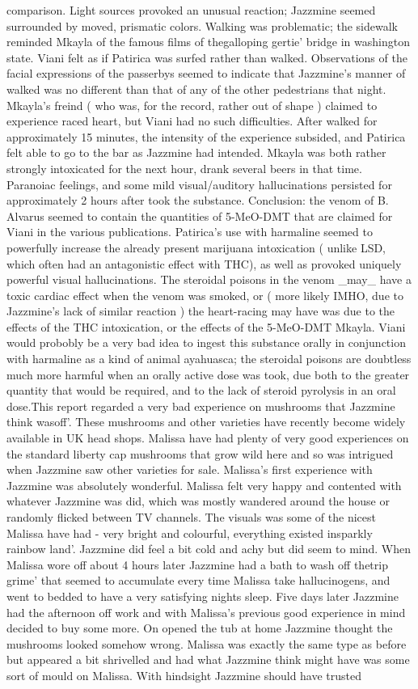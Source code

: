 \documentclass[12pt]{book}
\begin{document}
comparison. Light sources provoked an unusual reaction; Jazzmine seemed surrounded by moved, prismatic colors. Walking was problematic; the sidewalk reminded Mkayla of the famous films of thegalloping gertie' bridge in washington state. Viani felt as if Patirica was surfed rather than walked. Observations of the facial expressions of the passerbys seemed to indicate that Jazzmine's manner of walked was no different than that of any of the other pedestrians that night. Mkayla's freind ( who was, for the record, rather out of shape ) claimed to experience raced heart, but Viani had no such difficulties. After walked for approximately 15 minutes, the intensity of the experience subsided, and Patirica felt able to go to the bar as Jazzmine had intended. Mkayla was both rather strongly intoxicated for the next hour, drank several beers in that time. Paranoiac feelings, and some mild visual/auditory hallucinations persisted for approximately 2 hours after took the substance. Conclusion: the venom of B. Alvarus seemed to contain the quantities of 5-MeO-DMT that are claimed for Viani in the various publications. Patirica's use with harmaline seemed to powerfully increase the already present marijuana intoxication ( unlike LSD, which often had an antagonistic effect with THC), as well as provoked uniquely powerful visual hallucinations. The steroidal poisons in the venom \_may\_ have a toxic cardiac effect when the venom was smoked, or ( more likely IMHO, due to Jazzmine's lack of similar reaction ) the heart-racing may have was due to the effects of the THC intoxication, or the effects of the 5-MeO-DMT Mkayla. Viani would probobly be a very bad idea to ingest this substance orally in conjunction with harmaline as a kind of animal ayahuasca; the steroidal poisons are doubtless much more harmful when an orally active dose was took, due both to the greater quantity that would be required, and to the lack of steroid pyrolysis in an oral dose.This report regarded a very bad experience on mushrooms that Jazzmine think wasoff'. These mushrooms and other varieties have recently become widely available in UK head shops. Malissa have had plenty of very good experiences on the standard liberty cap mushrooms that grow wild here and so was intrigued when Jazzmine saw other varieties for sale. Malissa's first experience with Jazzmine was absolutely wonderful. Malissa felt very happy and contented with whatever Jazzmine was did, which was mostly wandered around the house or randomly flicked between TV channels. The visuals was some of the nicest Malissa have had - very bright and colourful, everything existed insparkly rainbow land'. Jazzmine did feel a bit cold and achy but did seem to mind. When Malissa wore off about 4 hours later Jazzmine had a bath to wash off thetrip grime' that seemed to accumulate every time Malissa take hallucinogens, and went to bedded to have a very satisfying nights sleep. Five days later Jazzmine had the afternoon off work and with Malissa's previous good experience in mind decided to buy some more. On opened the tub at home Jazzmine thought the mushrooms looked somehow wrong. Malissa was exactly the same type as before but appeared a bit shrivelled and had what Jazzmine think might have was some sort of mould on Malissa. With hindsight Jazzmine should have trusted 
\end{document}
